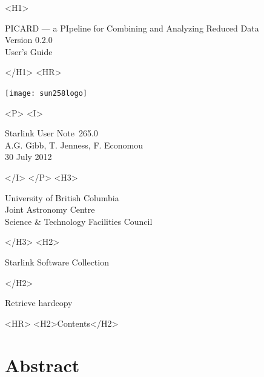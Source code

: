 \documentclass[twoside,11pt]{article}
\newcommand{\stardoccategory}  {Starlink User Note}
\newcommand{\stardocsource}    {sun\stardocnumber}
\newcommand{\stardocnumber}    {265.0}
\newcommand{\stardocauthors}   {A.G. Gibb, T. Jenness, F. Economou}
\newcommand{\stardocdate}      {30 July 2012}
\newcommand{\stardoctitle}     {PICARD --- a PIpeline for Combining and Analyzing Reduced Data}
\newcommand{\stardocversion}   {Version 0.2.0}
\newcommand{\stardocmanual}    {User's Guide}
\newcommand{\htmladdnormallink}[2]{#1}
\newcommand{\htmladdimg}[1]{}
\newcommand{\htmlref}[2]{#1}
\newcommand{\htmladdtonavigation}[1]{}
\newcommand{\xlabel}[1]{}
\renewcommand{\_}{\texttt{\symbol{95}}}
\begin{document}
\begin{htmlonly}
   \xlabel{}
   \begin{rawhtml} <H1> \end{rawhtml}
      \stardoctitle\\
      \stardocversion\\
      \stardocmanual
   \begin{rawhtml} </H1> <HR> \end{rawhtml}

\texttt{[image: sun258\_logo]}

   \begin{rawhtml} <P> <I> \end{rawhtml}
   \stardoccategory\ \stardocnumber \\
   \stardocauthors \\
   \stardocdate
   \begin{rawhtml} </I> </P> <H3> \end{rawhtml}
      \htmladdnormallink{University of British Columbia}
                        {http://www.ubc.ca} \\
      \htmladdnormallink{Joint Astronomy Centre}
                        {http://www.jach.hawaii.edu}\\
      \htmladdnormallink{Science \& Technology Facilities Council}
                        {http://www.stfc.ac.uk} \\
   \begin{rawhtml} </H3> <H2> \end{rawhtml}
      \htmladdnormallink{Starlink Software Collection}{http://starlink.jach.hawaii.edu/}
   \begin{rawhtml} </H2> \end{rawhtml}
   \htmladdnormallink{\htmladdimg{source.gif} Retrieve hardcopy}
      {http://starlink.jach.hawaii.edu/cgi-bin/hcserver?\stardocsource}\\

  \label{stardoccontents}
  \begin{rawhtml}
    <HR>
    <H2>Contents</H2>
  \end{rawhtml}
  \htmladdtonavigation{\htmlref{\htmladdimg{contents_motif.gif}}
        {stardoccontents}}

  \section{\xlabel{abstract}Abstract}
\end{htmlonly}
\end{document}
